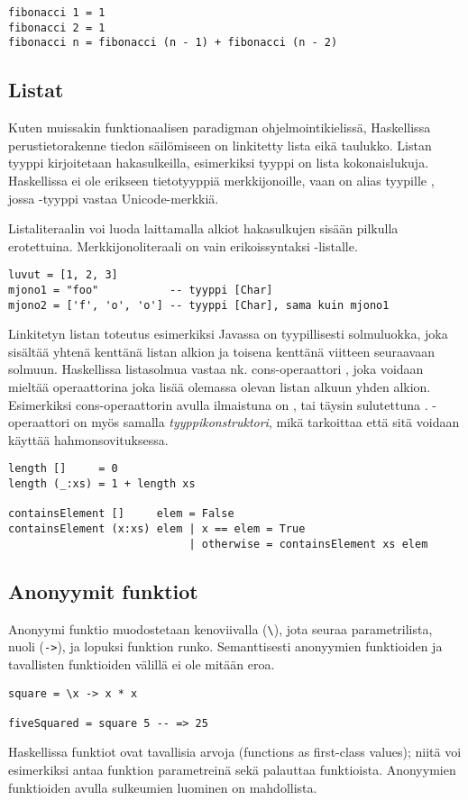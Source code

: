 \begin{verbatim}
fibonacci 1 = 1
fibonacci 2 = 1
fibonacci n = fibonacci (n - 1) + fibonacci (n - 2)
\end{verbatim}

\subsection{Listat}

Kuten muissakin funktionaalisen paradigman ohjelmointikielissä,
Haskellissa perustietorakenne tiedon säilömiseen on linkitetty lista eikä taulukko.
Listan tyyppi kirjoitetaan hakasulkeilla, esimerkiksi tyyppi \Haskell{[Integer]} on lista kokonaislukuja.
Haskellissa ei ole erikseen tietotyyppiä merkkijonoille,
vaan  on alias tyypille \Haskell{[Char]},
jossa -tyyppi vastaa Unicode-merkkiä.

Listaliteraalin voi luoda laittamalla alkiot hakasulkujen sisään pilkulla erotettuina.
Merkkijonoliteraali on vain erikoissyntaksi -listalle.
\begin{verbatim}
luvut = [1, 2, 3]
mjono1 = "foo"           -- tyyppi [Char]
mjono2 = ['f', 'o', 'o'] -- tyyppi [Char], sama kuin mjono1
\end{verbatim}

Linkitetyn listan toteutus esimerkiksi Javassa on tyypillisesti solmuluokka,
joka sisältää yhtenä kenttänä listan alkion ja toisena kenttänä viitteen seuraavaan solmuun.
Haskellissa listasolmua vastaa nk. cons-operaattori \Haskell{:}, joka voidaan
mieltää operaattorina joka lisää olemassa olevan listan alkuun yhden alkion.
Esimerkiksi \Haskell{[1, 2, 3]} cons-operaattorin avulla ilmaistuna on ,
tai täysin sulutettuna .
\Haskell{:}-operaattori on myös samalla \emph{tyyppikonstruktori},
mikä tarkoittaa että sitä voidaan käyttää hahmonsovituksessa.

\begin{verbatim}
length []     = 0
length (_:xs) = 1 + length xs

containsElement []     elem = False
containsElement (x:xs) elem | x == elem = True
                            | otherwise = containsElement xs elem
\end{verbatim}

\subsection{Anonyymit funktiot}
Anonyymi funktio muodostetaan kenoviivalla (\texttt{\textbackslash}), jota seuraa
parametrilista, nuoli (\texttt{->}), ja lopuksi funktion runko.
Semanttisesti anonyymien funktioiden ja tavallisten funktioiden välillä ei ole mitään eroa.
\begin{verbatim}
square = \x -> x * x

fiveSquared = square 5 -- => 25
\end{verbatim}
Haskellissa funktiot ovat tavallisia arvoja (functions as first-class values);
niitä voi esimerkiksi antaa funktion parametreinä sekä palauttaa funktioista.
Anonyymien funktioiden avulla sulkeumien luominen on mahdollista.

